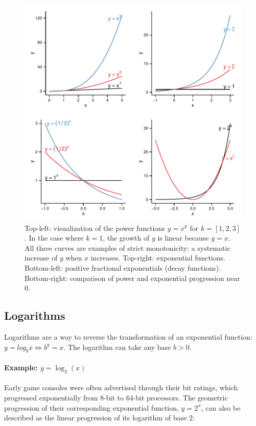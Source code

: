 \begin{knitrout}
\color{fgcolor}\begin{figure}[]

\includegraphics[width=\linewidth]{images/math-exps-and-powers} \caption{Top-left: visualization of the power functions $y = x^k$ for $k = [1,2,3]$. In the case where $k = 1$, the growth of $y$ is linear because $y = x$. All three curves are examples of strict monotonicity: a systematic increase of $y$ when $x$ increases. Top-right: exponential functions. Bottom-left: positive fractional exponentials (decay functions). Bottom-right: comparison of power and exponential progression near $0$.\label{fig:exps-and-powers}}
\end{figure}


\end{knitrout}


%
%
\subsection{Logarithms}

Logarithms are a way to reverse the transformation of an exponential function: $y = log_b x \iff b^y = x$. The logarithm can take any base $b > 0$.

%
\paragraph{Example: $y = \log_2(x)$} %
%
Early game consoles were often advertised through their bit ratings, which progressed exponentially from 8-bit to 64-bit processors. The geometric progression of their corresponding exponential function, $y = 2^x$, can also be described as the linear progression of its logarithm of base 2:

